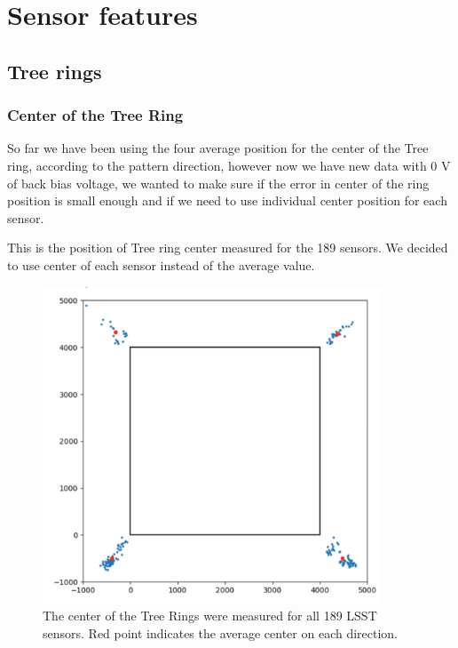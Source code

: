 \section{Sensor features}\label{sensor-features}

\subsection{Tree rings}\label{tree-rings}
\subsubsection{Center of the Tree Ring}
So far we have been using the four average position for the center of the Tree ring, according to the pattern direction, however now we have new data with 0 V of back bias voltage, we wanted to make sure if the error in center of the ring position is small enough and if we need to use individual center position for each sensor. 

This is the position of Tree ring center measured for the 189 sensors. We decided to use center of each sensor instead of the average value. 

\begin{figure}
\begin{centering}
\includegraphics[width=0.9\textwidth]{sections/figures/TR_centers.png}
\end{centering}
\caption{The center of the Tree Rings were measured for all 189 LSST sensors. Red point indicates the average center on each direction.}
\end{figure}

